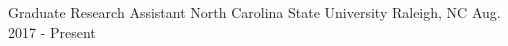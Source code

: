 \begin{cventries}
  \cventry
    {Graduate Research Assistant}
    {North Carolina State University}
    {Raleigh, NC}
    {Aug. 2017 - Present}
    {
      \begin{cvitems}
      \end{cvitems}
    }

\end{cventries}
